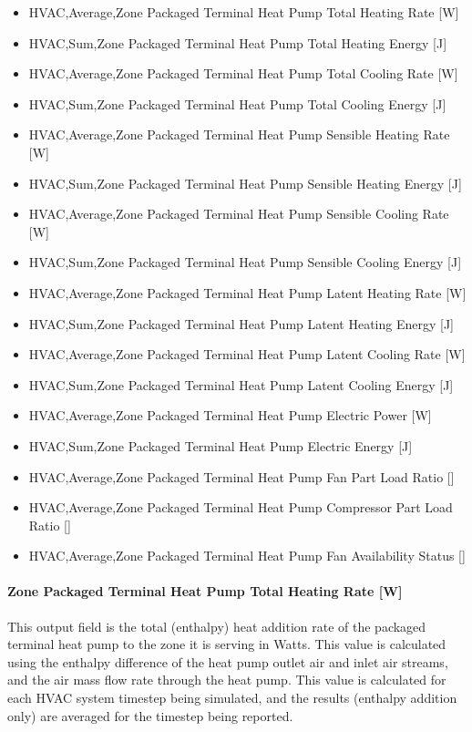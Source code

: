 \begin{itemize}
\item
  HVAC,Average,Zone Packaged Terminal Heat Pump Total Heating Rate {[}W{]}
\item
  HVAC,Sum,Zone Packaged Terminal Heat Pump Total Heating Energy {[}J{]}
\item
  HVAC,Average,Zone Packaged Terminal Heat Pump Total Cooling Rate {[}W{]}
\item
  HVAC,Sum,Zone Packaged Terminal Heat Pump Total Cooling Energy {[}J{]}
\item
  HVAC,Average,Zone Packaged Terminal Heat Pump Sensible Heating Rate {[}W{]}
\item
  HVAC,Sum,Zone Packaged Terminal Heat Pump Sensible Heating Energy {[}J{]}
\item
  HVAC,Average,Zone Packaged Terminal Heat Pump Sensible Cooling Rate {[}W{]}
\item
  HVAC,Sum,Zone Packaged Terminal Heat Pump Sensible Cooling Energy {[}J{]}
\item
  HVAC,Average,Zone Packaged Terminal Heat Pump Latent Heating Rate {[}W{]}
\item
  HVAC,Sum,Zone Packaged Terminal Heat Pump Latent Heating Energy {[}J{]}
\item
  HVAC,Average,Zone Packaged Terminal Heat Pump Latent Cooling Rate {[}W{]}
\item
  HVAC,Sum,Zone Packaged Terminal Heat Pump Latent Cooling Energy {[}J{]}
\item
  HVAC,Average,Zone Packaged Terminal Heat Pump Electric Power {[}W{]}
\item
  HVAC,Sum,Zone Packaged Terminal Heat Pump Electric Energy {[}J{]}
\item
  HVAC,Average,Zone Packaged Terminal Heat Pump Fan Part Load Ratio {[]}
\item
  HVAC,Average,Zone Packaged Terminal Heat Pump Compressor Part Load Ratio {[]}
\item
  HVAC,Average,Zone Packaged Terminal Heat Pump Fan Availability Status {[]}
\end{itemize}

\paragraph{Zone Packaged Terminal Heat Pump Total Heating Rate {[}W{]}}\label{zone-packaged-terminal-heat-pump-total-heating-rate-w}

This output field is the total (enthalpy) heat addition rate of the packaged terminal heat pump to the zone it is serving in Watts. This value is calculated using the enthalpy difference of the heat pump outlet air and inlet air streams, and the air mass flow rate through the heat pump. This value is calculated for each HVAC system timestep being simulated, and the results (enthalpy addition only) are averaged for the timestep being reported.

